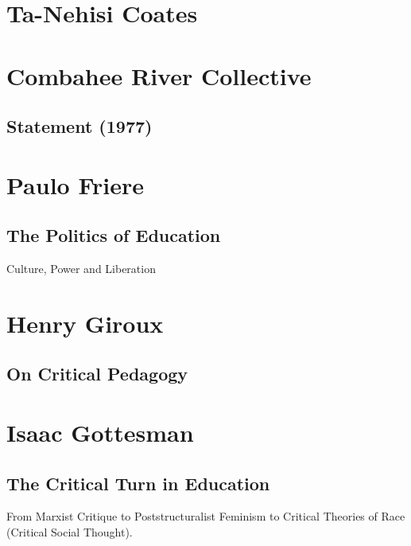 \documentclass[10pt,titlepage]{book}
\begin{document}
\section{Ta-Nehisi Coates}

\subsection{\cite{coatestnh-bwm,coatestnh-wweyip}}

\section{Combahee River Collective}\label{Combahee}

\subsection{Statement (1977) \cite{combahee-statement}}

\section{Paulo Friere}\label{Friere}

\subsection{The Politics of Education \cite{friere-poled}}\label{Friere}

Culture, Power and Liberation

\section{Henry Giroux}\label{Giroux}

\subsection{On Critical Pedagogy \cite{giroux-critped}}

\section{Isaac Gottesman}\label{Gottesman}

\subsection{The Critical Turn in Education \cite{gottesman-criturn}}

From Marxist Critique to Poststructuralist Feminism to Critical Theories of Race (Critical Social Thought).
\end{document}
